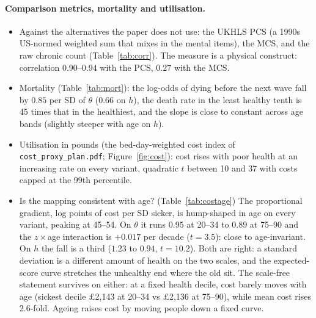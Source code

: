\documentclass[11pt]{article}
\newcommand{\code}[1]{\texttt{\small #1}}
\begin{document}
\paragraph{Comparison metrics, mortality and utilisation.}
\begin{itemize}
\item Against the alternatives the paper does not use: the UKHLS PCS (a 1990s US-normed weighted sum that mixes in the mental items), the MCS, and the raw chronic count (Table~\ref{tab:corr}). The measure is a physical construct: correlation $0.90$--$0.94$ with the PCS, $0.27$ with the MCS.
\item Mortality (Table~\ref{tab:mort}): the log-odds of dying before the next wave fall by $0.85$ per SD of $\theta$ ($0.66$ on $h$), the death rate in the least healthy tenth is 45 times that in the healthiest, and the slope is close to constant across age bands (slightly steeper with age on $h$).
\item Utilisation in pounds (the bed-day-weighted cost index of \code{cost\_proxy\_plan.pdf}; Figure~\ref{fig:cost}): cost rises with poor health at an increasing rate on every variant, quadratic $t$ between 10 and 37 with costs capped at the 99th percentile.
\item Is the mapping consistent with age? (Table~\ref{tab:costage}) The proportional gradient, log points of cost per SD sicker, is hump-shaped in age on every variant, peaking at 45--54. On $\theta$ it runs $0.95$ at 20--34 to $0.89$ at 75--90 and the $z\times$age interaction is $+0.017$ per decade ($t=3.5$): close to age-invariant. On $h$ the fall is a third ($1.23$ to $0.94$, $t=10.2$). Both are right: a standard deviation is a different amount of health on the two scales, and the expected-score curve stretches the unhealthy end where the old sit. The scale-free statement survives on either: at a fixed health decile, cost barely moves with age (sickest decile \pounds2,143 at 20--34 vs \pounds2,136 at 75--90), while mean cost rises 2.6-fold. Ageing raises cost by moving people down a fixed curve.
\end{itemize}

\begin{table}[H]\centering\small

\caption{Correlations of the three variants with the comparison metrics, 385,427 person-waves.}
\label{tab:corr}
\end{table}

\begin{table}[H]\centering\small

\caption{Log-odds of death before the next wave per standard deviation of each variant, with a quadratic in age (standard errors in brackets), overall and within age bands; 363,033 person-waves at risk, 1,825 deaths. Decile ratio: death rate in the least healthy tenth over the healthiest.}
\label{tab:mort}
\end{table}
\end{document}
